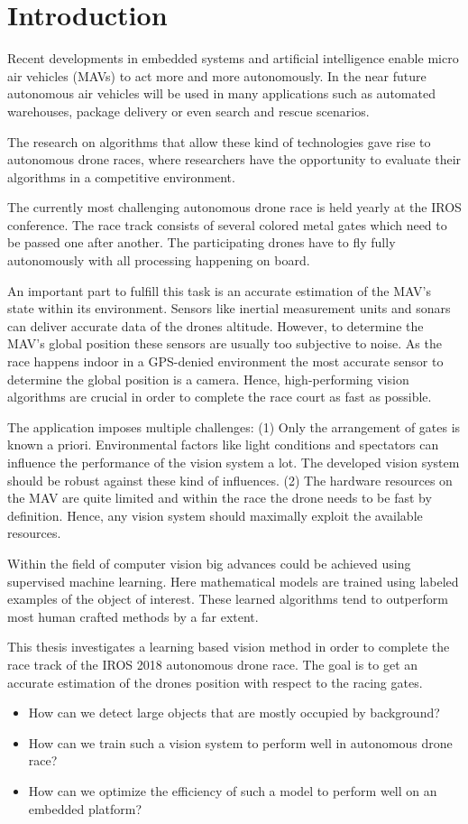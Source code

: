 \chapter{Introduction}
\label{sec:intro}

Recent developments in embedded systems and artificial intelligence enable micro air vehicles (MAVs) to act more and more autonomously. In the near future autonomous air vehicles will be used in many applications such as automated warehouses, package delivery or even search and rescue scenarios.

The research on algorithms that allow these kind of technologies gave rise to autonomous drone races, where researchers have the opportunity to evaluate their algorithms in a competitive environment.

The currently most challenging autonomous drone race is held yearly at the IROS conference. The race track consists of several colored metal gates which need to be passed one after another. The participating drones have to fly fully autonomously with all processing happening on board.

An important part to fulfill this task is an accurate estimation of the MAV's state within its environment. Sensors like inertial measurement units and sonars can deliver accurate data of the drones altitude. However, to determine the MAV's global position these sensors are usually too subjective to noise. As the race happens indoor in a GPS-denied environment the most accurate sensor to determine the global position is a camera. Hence, high-performing vision algorithms are crucial in order to complete the race court as fast as possible. 

The application imposes multiple challenges: (1) Only the arrangement of gates is known a priori. Environmental factors like light conditions and spectators can influence the performance of the vision system a lot. The developed vision system should be robust against these kind of influences. (2) The hardware resources on the MAV are quite limited and within the race the drone needs to be fast by definition. Hence, any vision system should maximally exploit the available resources.

Within the field of computer vision big advances could be achieved using supervised machine learning. Here mathematical models are trained using labeled examples of the object of interest. These learned algorithms tend to outperform most human crafted methods by a far extent.

This thesis investigates a learning based vision method in order to complete the race track of the IROS 2018 autonomous drone race. The goal is to get an accurate estimation of the drones position with respect to the racing gates.

\begin{itemize}
	\item How can we detect large objects that are mostly occupied by background?
	\item How can we train such a vision system to perform well in autonomous drone race?
	\item How can we optimize the efficiency of such a model to perform well on an embedded platform?
\end{itemize}